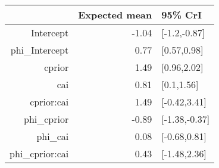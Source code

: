 \begin{tabular}{rrl}
  \hline
 & Expected mean & 95\% CrI \\ 
  \hline
Intercept & -1.04 & [-1.2,-0.87] \\ 
  phi\_Intercept & 0.77 & [0.57,0.98] \\ 
  cprior & 1.49 & [0.96,2.02] \\ 
  cai & 0.81 & [0.1,1.56] \\ 
  cprior:cai & 1.49 & [-0.42,3.41] \\ 
  phi\_cprior & -0.89 & [-1.38,-0.37] \\ 
  phi\_cai & 0.08 & [-0.68,0.81] \\ 
  phi\_cprior:cai & 0.43 & [-1.48,2.36] \\ 
   \hline
\end{tabular}

